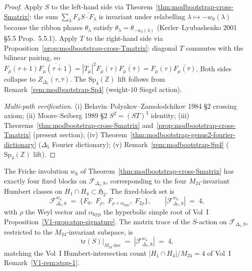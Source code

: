 \begin{proof}
Apply $S$ to the left-hand side via
Theorem~\ref{thm:modbootstrap-cross-Smatrix}: the sum
$\sum_\lambda F_\lambda\overline{S\cdot F_\lambda}$ is
invariant under relabelling
$\lambda\mapsto -w_0(\lambda)$ because the ribbon phases
$\theta_\lambda$ satisfy $\theta_\lambda = \theta_{-w_0(\lambda)}$
(Kerler--Lyubashenko 2001 \S 5.5 Prop.~5.5.1). Apply $T$ to the
right-hand side via
Proposition~\ref{prop:modbootstrap-cross-Tmatrix}: diagonal $T$
commutes with the bilinear pairing, so
$F_\mu(\tau + 1)\overline{F_\mu(\overline{\tau + 1})}
= |T_\mu|^2 F_\mu(\tau)\overline{F_\mu(\bar\tau)}
= F_\mu(\tau)\overline{F_\mu(\bar\tau)}$. Both sides collapse to
$Z_{\Delta_5}(\tau,\bar\tau)$. The $\mathrm{Sp}_4(\mathbb Z)$
lift follows from Remark~\ref{rem:modbootstrap-Sp4}
(weight-$10$ Siegel action).

\emph{Multi-path verification.}
(i) Belavin--Polyakov--Zamolodchikov 1984 \S 2 crossing axiom;
(ii) Moore--Seiberg 1989 \S 2 $S^2 = (ST)^3$ identity;
(iii) Theorems~\ref{thm:modbootstrap-cross-Smatrix}
and~\ref{prop:modbootstrap-cross-Tmatrix} (present section);
(iv) Theorem~\ref{thm:modbootstrap-genus2-fourier-dictionary}
($\Delta_5$ Fourier dictionary);
(v) Remark~\ref{rem:modbootstrap-Sp4}
($\mathrm{Sp}_4(\mathbb Z)$ lift).
\end{proof}

\begin{theorem}
\label{thm:modbootstrap-cross-four-fricke-fixed}
\ClaimStatusConditional
{}
The Fricke involution $w_8$ of
Theorem~\ref{thm:modbootstrap-cross-Smatrix} has exactly four
fixed blocks on $\mathcal F_{\Delta_5, 8}$, corresponding to
the four $M_{24}$-invariant Humbert classes on
$H_1\cap H_4\subset\mathfrak H_2$. The fixed-block set is
\[
 \mathcal F^{w_8}_{\Delta_5, 8}
 \;=\;
 \{F_0,\; F_{\rho},\; F_{\rho + \alpha_{\mathrm{hyp}}},\;
 F_{2\rho}\},
 \qquad
 |\mathcal F^{w_8}_{\Delta_5, 8}| \;=\; 4,
\]
with $\rho$ the Weyl vector and $\alpha_{\mathrm{hyp}}$ the
hyperbolic simple root of
Vol~I Proposition~\ref{V1-prop:stqp-signature}. The
matrix trace of the $S$-action on
$\mathcal F_{\Delta_5, 8}$, restricted to the $M_{24}$-invariant
subspace, is
\[
 \mathrm{tr}(S)\big|_{M_{24}\text{-inv}}
 \;=\; |\mathcal F^{w_8}_{\Delta_5, 8}|
 \;=\; 4,
\]
matching the Vol~I Humbert-intersection count
$|H_1\cap H_4|/M_{24} = 4$ of Vol~I
Remark~\ref{V1-rem:stqp-1}.
\end{theorem}

